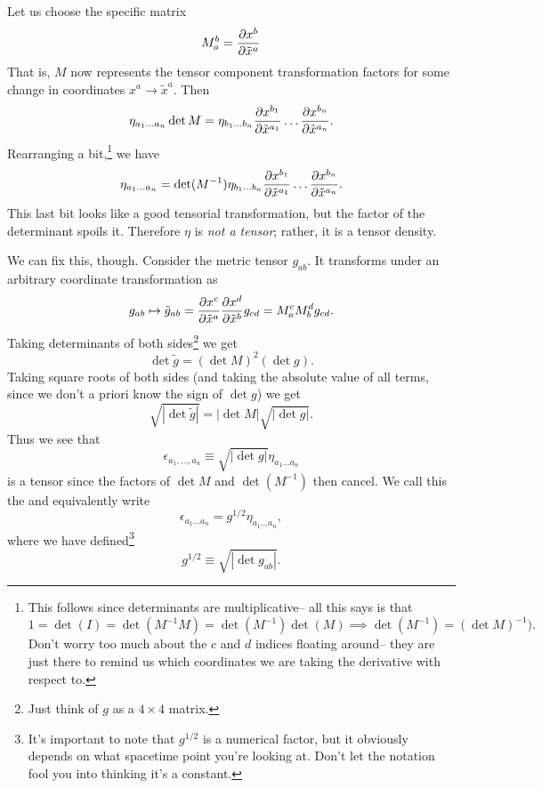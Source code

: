 Let us choose the specific matrix $$M^b_a=\frac{\partial x^b}{\partial \tilde x^a}$$ That is, $M$ now represents the tensor component transformation factors for some change in coordinates $x^a\to \tilde x^a$. Then
$$\eta_{a_1\ldots a_n}\det M=\eta_{b_1\ldots b_n}\frac{\partial x^{b_1}}{\partial \tilde x^{a_1}}\ldots \frac{\partial x^{b_n}}{\partial \tilde x^{a_n}}.$$
Rearranging a bit,\footnote{This follows since determinants are multiplicative-- all this says is that $1=\det(I)=\det(M^{-1} M)=\det(M^{-1})\det(M)\implies \det(M^{-1})= (\det M)^{-1}).$ Don't worry too much about the $c$ and $d$ indices floating around-- they are just there to remind us which coordinates we are taking the derivative with respect to.} we have
$$\eta_{a_1\ldots a_n}=\det (M^{-1})\eta_{b_1\ldots b_n}\frac{\partial x^{b_1}}{\partial \tilde x^{a_1}}\ldots \frac{\partial x^{b_n}}{\partial \tilde x^{a_n}}.$$
This last bit looks like a good tensorial transformation, but the factor of the determinant spoils it. Therefore $\eta$ is \emph{not a tensor}; rather, it is a tensor density.

We can fix this, though. Consider the metric tensor $g_{ab}$. It transforms under an arbitrary coordinate transformation as
$$g_{ab}\mapsto \tilde g_{ab}=\frac{\partial x^c}{\partial \tilde x^a}\frac{\partial x^d}{\partial\tilde x^b}g_{cd}=M^c_a M^d_b g_{cd}.$$
Taking determinants of both sides\footnote{Just think of $g$ as a $4\times 4$ matrix.} we get
$$\det \tilde g = (\det M)^2 (\det g).$$
Taking square roots of both sides (and taking the absolute value of all terms, since we don't a priori know the sign of $\det g$) we get
$$\sqrt{|\det \tilde g|}=|\det M|\sqrt{|\det g|}.$$
Thus we see that
$$\epsilon_{a_1,\ldots, a_n}\equiv \sqrt{|\det g|}\eta_{a_1\ldots a_n}$$ is a tensor since the factors of $\det M$ and $\det (M^{-1})$ then cancel. We call this the  and equivalently write
$$\epsilon_{a_1\ldots a_n}=g^{1/2}\eta_{a_1\ldots a_n},$$ where we have defined\footnote{It's important to note that $g^{1/2}$ is a numerical factor, but it obviously depends on what spacetime point you're looking at. Don't let the notation fool you into thinking it's a constant.}
\begin{equation}
    g^{1/2}\equiv\sqrt{|\det g_{ab}|}.
\end{equation}

